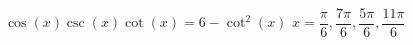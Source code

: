{ $\cos(x)\csc(x)\cot(x) = 6-\cot^{2}(x)$}
{ $x = \dfrac{\pi}{6}, \dfrac{7\pi}{6}, \dfrac{5\pi}{6}, \dfrac{11\pi}{6}$}
